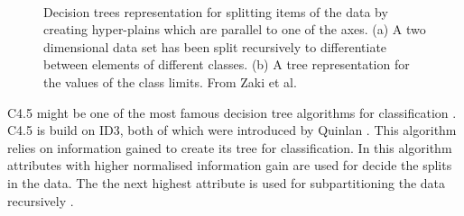 \begin{figure}[!h]
    \hfill{\begin{minipage}{\dimexpr \textwidth-2\fboxsep-2\fboxrule}%
            \centering
            \\

    \end{minipage}}
    \caption{Decision trees representation for splitting items of the data by creating hyper-plains which are parallel to one of the axes. 
        (a) A two dimensional data set has been split recursively to differentiate between elements of different classes.
        (b) A tree representation for the values of the class limits.
        From Zaki et al. \cite{Zaki2014}}
    \label{fig:Recurcive2Decision}
\end{figure}

C4.5 might be one of the most famous decision tree algorithms for classification \cite{Wu2008}. C4.5 is build on ID3, both of which were introduced by Quinlan \cite{Quinlan2014}. This algorithm relies on information gained to create its tree for classification. In this algorithm attributes with higher normalised information gain are used for decide the splits in the data. The the next highest attribute is used for subpartitioning the data recursively \cite{Quinlan2014}.

